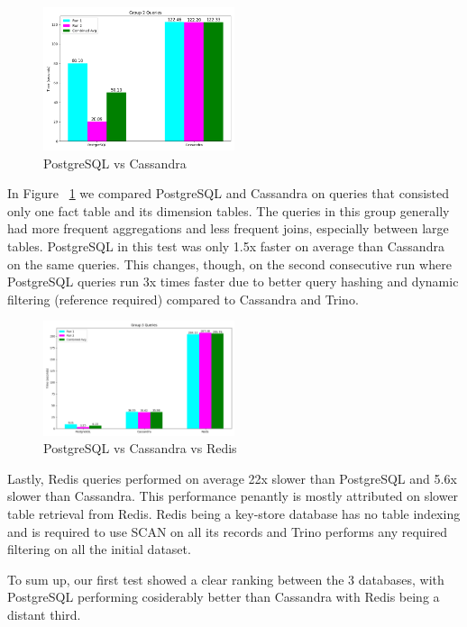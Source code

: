 \documentclass[conference]{IEEEtran}
\begin{document}
\begin{figure}[h]
	\centering
	\includegraphics[width=0.5\textwidth]{images/DBs_bench_no_distro/group2.png}
	\caption{PostgreSQL vs Cassandra}
	\label{fig:psql-cass-group2}
\end{figure}

In Figure ~\ref{fig:psql-cass-group2} we compared PostgreSQL and Cassandra on queries that consisted only one fact table and its dimension tables. The queries in this group generally had more frequent aggregations and less frequent joins, especially between large tables. PostgreSQL in this test was only 1.5x faster on average than Cassandra on the same queries. This changes, though, on the second consecutive run where PostgreSQL queries run 3x times faster due to better query hashing and dynamic filtering (reference required) compared to Cassandra and Trino.

\begin{figure}[h]
	\centering
	\includegraphics[width=0.5\textwidth]{images/DBs_bench_no_distro/group3.png}
	\caption{PostgreSQL vs Cassandra vs Redis}
	\label{fig:store_sales_er_diagram}
\end{figure}

Lastly, Redis queries performed on average 22x slower than PostgreSQL and 5.6x slower than Cassandra. This performance penantly is mostly attributed on slower table retrieval from Redis. Redis being a key-store database has no table indexing and is required to use SCAN on all its records and Trino performs any required filtering on all the initial dataset.

To sum up, our first test showed a clear ranking between the 3 databases, with PostgreSQL performing cosiderably better than Cassandra with Redis being a distant third.
\end{document}
